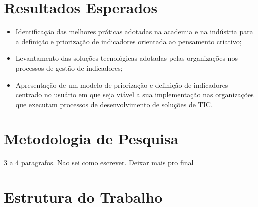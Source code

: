 \section{Resultados Esperados}


\begin{itemize}

\item Identificação das melhores práticas adotadas na academia e na indústria para a definição e priorização de indicadores orientada ao pensamento criativo;

\item Levantamento das soluções tecnológicas adotadas pelas organizações nos processos de gestão de indicadores;

\item Apresentação de um modelo de priorização e definição de indicadores centrado no usuário em que seja viável a sua implementação nas organizações que executam processos de desenvolvimento de soluções de TIC.

\end{itemize}

\section{Metodologia de Pesquisa}

3 a 4 paragrafos. Nao sei como escrever. Deixar mais pro final

\section{Estrutura do Trabalho}



